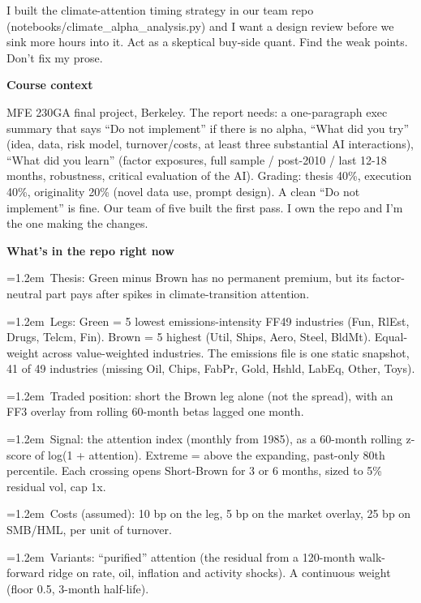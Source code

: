 \par\noindent I built the climate-attention timing strategy in our team repo (notebooks/climate\_alpha\_analysis.py) and I want a design review before we sink more hours into it. Act as a skeptical buy-side quant. Find the weak points. Don't fix my prose.
\medskip
\par\textbf{Course context}
\par\noindent MFE 230GA final project, Berkeley. The report needs: a one-paragraph exec summary that says ``Do not implement'' if there is no alpha, ``What did you try'' (idea, data, risk model, turnover/costs, at least three substantial AI interactions), ``What did you learn'' (factor exposures, full sample / post-2010 / last 12-18 months, robustness, critical evaluation of the AI). Grading: thesis 40\%, execution 40\%, originality 20\% (novel data use, prompt design). A clean ``Do not implement'' is fine. Our team of five built the first pass. I own the repo and I'm the one making the changes.
\medskip
\par\textbf{What's in the repo right now}
\par\hangindent=1.2em\noindent\textbullet~Thesis: Green minus Brown has no permanent premium, but its factor-neutral part pays after spikes in climate-transition attention.
\par\hangindent=1.2em\noindent\textbullet~Legs: Green = 5 lowest emissions-intensity FF49 industries (Fun, RlEst, Drugs, Telcm, Fin). Brown = 5 highest (Util, Ships, Aero, Steel, BldMt). Equal-weight across value-weighted industries. The emissions file is one static snapshot, 41 of 49 industries (missing Oil, Chips, FabPr, Gold, Hshld, LabEq, Other, Toys).
\par\hangindent=1.2em\noindent\textbullet~Traded position: short the Brown leg alone (not the spread), with an FF3 overlay from rolling 60-month betas lagged one month.
\par\hangindent=1.2em\noindent\textbullet~Signal: the attention index (monthly from 1985), as a 60-month rolling z-score of log(1 + attention). Extreme = above the expanding, past-only 80th percentile. Each crossing opens Short-Brown for 3 or 6 months, sized to 5\% residual vol, cap 1x.
\par\hangindent=1.2em\noindent\textbullet~Costs (assumed): 10 bp on the leg, 5 bp on the market overlay, 25 bp on SMB/HML, per unit of turnover.
\par\hangindent=1.2em\noindent\textbullet~Variants: ``purified'' attention (the residual from a 120-month walk-forward ridge on rate, oil, inflation and activity shocks). A continuous weight (floor 0.5, 3-month half-life).
